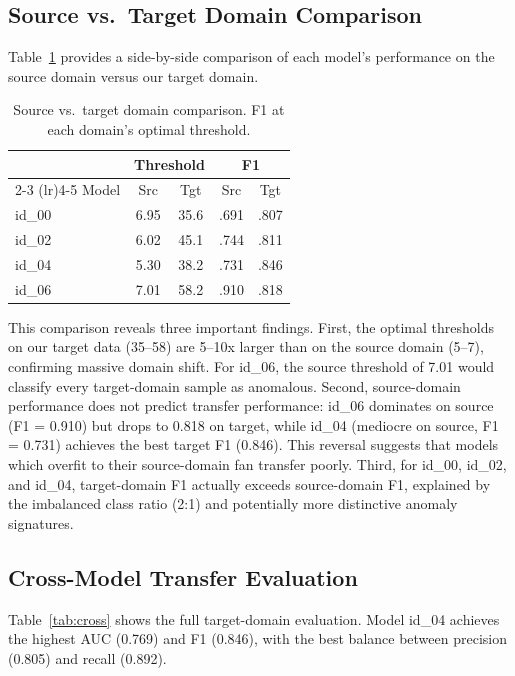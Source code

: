 \documentclass[sigconf]{acmart}
\begin{document}
\subsection{Source vs.\ Target Domain Comparison}

Table~\ref{tab:srctgt} provides a side-by-side comparison of each model's performance on the source domain versus our target domain.

\begin{table}[t]
\centering
\caption{Source vs.\ target domain comparison. F1 at each domain's optimal threshold.}
\label{tab:srctgt}
\begin{tabular}{l c c c c}
\toprule
& \multicolumn{2}{c}{Threshold} & \multicolumn{2}{c}{F1} \\
\cmidrule(lr){2-3} \cmidrule(lr){4-5}
Model & Src & Tgt & Src & Tgt \\
\midrule
id\_00 & 6.95 & 35.6 & .691 & .807 \\
id\_02 & 6.02 & 45.1 & .744 & .811 \\
id\_04 & 5.30 & 38.2 & .731 & .846 \\
id\_06 & 7.01 & 58.2 & .910 & .818 \\
\bottomrule
\end{tabular}
\end{table}

This comparison reveals three important findings. First, the optimal thresholds on our target data (35--58) are 5--10x larger than on the source domain (5--7), confirming massive domain shift. For id\_06, the source threshold of 7.01 would classify every target-domain sample as anomalous. Second, source-domain performance does not predict transfer performance: id\_06 dominates on source (F1 = 0.910) but drops to 0.818 on target, while id\_04 (mediocre on source, F1 = 0.731) achieves the best target F1 (0.846). This reversal suggests that models which overfit to their source-domain fan transfer poorly. Third, for id\_00, id\_02, and id\_04, target-domain F1 actually exceeds source-domain F1, explained by the imbalanced class ratio (2:1) and potentially more distinctive anomaly signatures.

\subsection{Cross-Model Transfer Evaluation}

Table~\ref{tab:cross} shows the full target-domain evaluation. Model id\_04 achieves the highest AUC (0.769) and F1 (0.846), with the best balance between precision (0.805) and recall (0.892).
\end{document}
